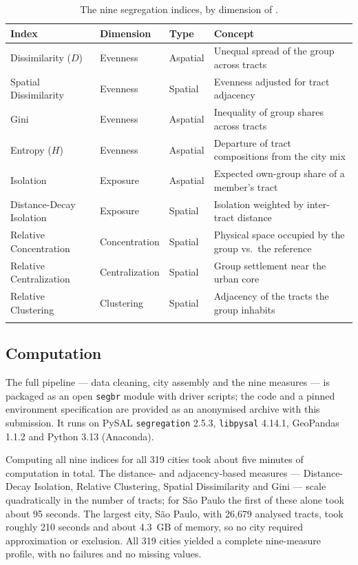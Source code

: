 \documentclass[pdflatex,sn-basic]{sn-jnl}%
\begin{document}
\begin{table}[h]
\caption{The nine segregation indices, by dimension of \citet{massey1988dimensions}.}\label{tab:measures}
\begin{tabular}{@{}lllp{5.4cm}@{}}
\toprule
Index & Dimension & Type & Concept \\
\midrule
Dissimilarity ($D$) & Evenness & Aspatial & Unequal spread of the group across tracts \\
Spatial Dissimilarity & Evenness & Spatial & Evenness adjusted for tract adjacency \\
Gini & Evenness & Aspatial & Inequality of group shares across tracts \\
Entropy ($H$) & Evenness & Aspatial & Departure of tract compositions from the city mix \\
Isolation & Exposure & Aspatial & Expected own-group share of a member's tract \\
Distance-Decay Isolation & Exposure & Spatial & Isolation weighted by inter-tract distance \\
Relative Concentration & Concentration & Spatial & Physical space occupied by the group vs.\ the reference \\
Relative Centralization & Centralization & Spatial & Group settlement near the urban core \\
Relative Clustering & Clustering & Spatial & Adjacency of the tracts the group inhabits \\
\botrule
\end{tabular}
\end{table}

\subsection{Computation}\label{subsec:computation}

The full pipeline --- data cleaning, city assembly and the nine measures --- is packaged as an open \texttt{segbr} module with driver scripts; the code and a pinned environment specification are provided as an anonymised archive with this submission. It runs on PySAL \texttt{segregation} 2.5.3, \texttt{libpysal} 4.14.1, GeoPandas 1.1.2 and Python 3.13 (Anaconda).

Computing all nine indices for all 319 cities took about five minutes of computation in total. The distance- and adjacency-based measures --- Distance-Decay Isolation, Relative Clustering, Spatial Dissimilarity and Gini --- scale quadratically in the number of tracts; for S\~ao Paulo the first of these alone took about 95 seconds. The largest city, S\~ao Paulo, with 26{,}679 analysed tracts, took roughly 210 seconds and about 4.3~GB of memory, so no city required approximation or exclusion. All 319 cities yielded a complete nine-measure profile, with no failures and no missing values.
\end{document}
